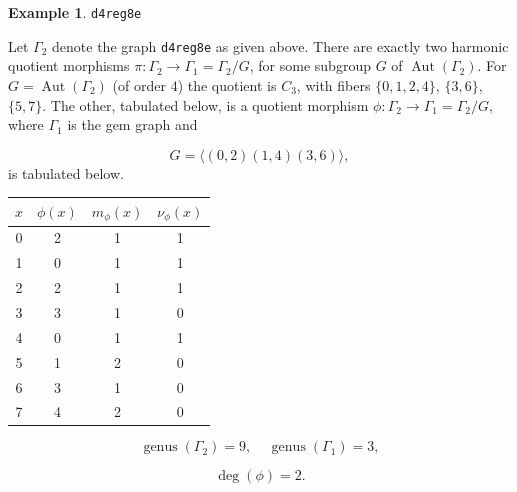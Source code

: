 \documentclass[12pt,letterpaper]{article}
\theoremstyle{definition}
\newtheorem{example}[theorem]{Example}
\DeclareMathOperator{\Aut}{Aut}
\DeclareMathOperator{\genus}{genus}
\begin{document}
\begin{example}%
\label{example:d4reg8e}
 {\tt d4reg8e}\newline
{\rm  
  Let $\Gamma_2$ denote the graph {\tt d4reg8e} as given above.
There are exactly two harmonic quotient morphisms
$\pi: \Gamma_2\to \Gamma_1=\Gamma_2/G$,
for some subgroup $G$ of $\Aut(\Gamma_2)$.
For $G=\Aut(\Gamma_2)$ (of order $4$) the quotient is $C_3$, with fibers
$\{0,1,2,4\}$, $\{3,6\}$, $\{5,7\}$.
The other, tabulated below, is a quotient morphism
$\phi: \Gamma_2\to \Gamma_1=\Gamma_2/G$,
where $\Gamma_1$ is the gem graph and

\[
G = \langle (0,2)(1,4)(3,6) \rangle,
\]
is tabulated below.

\begin{center}
\begin{tabular}{c|c|c|c}  
  $x$ & $\phi(x)$ & $m_\phi(x)$ & $\nu_\phi(x)$ \\ \hline
  0   &    2   &        1         &  1   \\ 
  1   &    0   &        1         &  1  \\ 
  2   &    2   &        1         &  1  \\ 
  3   &    3   &        1         &  0  \\ 
  4   &    0   &        1         &  1   \\
  5   &    1   &        2         &  0   \\
  6   &    3   &        1         &  0   \\
  7   &    4   &        2         &  0   \\     
\end{tabular}
\end{center}

\[
  \genus(\Gamma_2) =9,\ \ \ \ \
  \genus(\Gamma_1) =3,
\]

\[
\deg(\phi) =2.
\]

}
\end{example}
\end{document}
